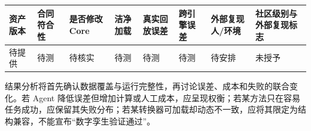 \documentclass[
  chinese,
  11pt,
  a4paper,
  fontset=fandol]{ctexart}
\newcounter{none} %
\begin{document}
{\def\LTcaptype{none} %
\begin{longtable}[]{@{}
  >{\raggedright\arraybackslash}p{}
  >{\raggedright\arraybackslash}p{}
  >{\raggedright\arraybackslash}p{}
  >{\raggedright\arraybackslash}p{}
  >{\raggedright\arraybackslash}p{}
  >{\raggedright\arraybackslash}p{}
  >{\raggedright\arraybackslash}p{}
  >{\raggedright\arraybackslash}p{}@{}}
\toprule\noalign{}
\begin{minipage}[b]{\linewidth}\raggedright
资产版本
\end{minipage} & \begin{minipage}[b]{\linewidth}\raggedright
合同符合性
\end{minipage} & \begin{minipage}[b]{\linewidth}\raggedright
是否修改 Core
\end{minipage} & \begin{minipage}[b]{\linewidth}\raggedright
洁净加载
\end{minipage} & \begin{minipage}[b]{\linewidth}\raggedright
真实回放误差
\end{minipage} & \begin{minipage}[b]{\linewidth}\raggedright
跨引擎误差
\end{minipage} & \begin{minipage}[b]{\linewidth}\raggedright
外部复现人/环境
\end{minipage} & \begin{minipage}[b]{\linewidth}\raggedright
社区级别与外部复现标志
\end{minipage} \\
\midrule\noalign{}
\endhead
\bottomrule\noalign{}
\endlastfoot
待提供 & 待测 & 待核实 & 待测 & 待测 & 待测 & 待安排 & 未授予 \\
\end{longtable}
}

结果分析将首先确认数据覆盖与运行完整性，再讨论误差、成本和失败的联合变化。若
Agent
降低误差但增加计算或人工成本，应呈现权衡；若某方法只在容易任务成功，应保留其失败分布；若某转换器可加载却动态不一致，应将其限定为结构兼容，不能宣布``数字孪生验证通过''。
\end{document}

